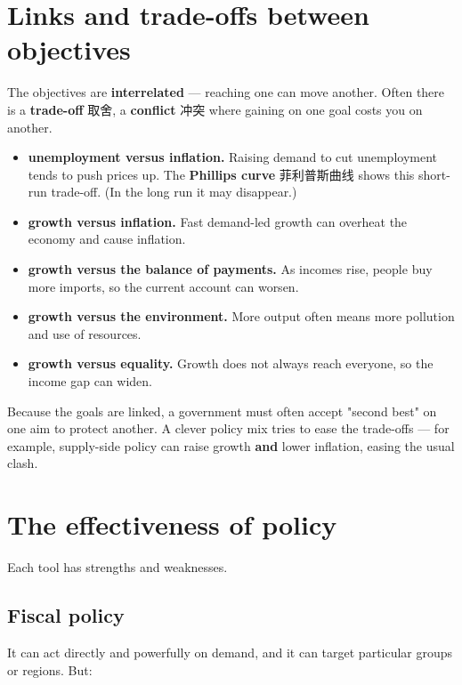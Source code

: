 \documentclass[11pt]{article}
\begin{document}
\section*{Links and trade-offs between objectives}

The objectives are \textbf{interrelated} — reaching one can move another. Often there is a \textbf{trade-off} 取舍, a \textbf{conflict} 冲突 where gaining on one goal costs you on another.

\begin{itemize}
\item \textbf{unemployment versus inflation.} Raising demand to cut unemployment tends to push prices up. The \textbf{Phillips curve} 菲利普斯曲线 shows this short-run trade-off. (In the long run it may disappear.)

\item \textbf{growth versus inflation.} Fast demand-led growth can overheat the economy and cause inflation.

\item \textbf{growth versus the balance of payments.} As incomes rise, people buy more imports, so the current account can worsen.

\item \textbf{growth versus the environment.} More output often means more pollution and use of resources.

\item \textbf{growth versus equality.} Growth does not always reach everyone, so the income gap can widen.

\end{itemize}

Because the goals are linked, a government must often accept "second best" on one aim to protect another. A clever policy mix tries to ease the trade-offs — for example, supply-side policy can raise growth \textbf{and} lower inflation, easing the usual clash.

\section*{The effectiveness of policy}

Each tool has strengths and weaknesses.

\subsection*{Fiscal policy}

It can act directly and powerfully on demand, and it can target particular groups or regions. But:
\end{document}
